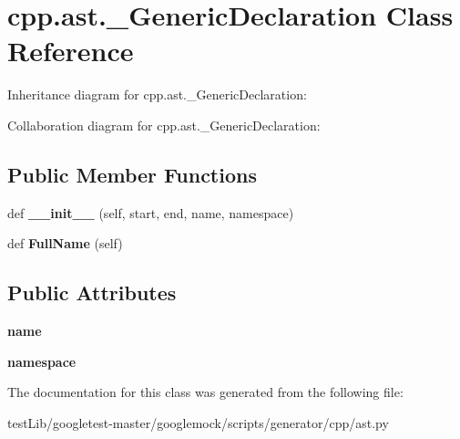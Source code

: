 \hypertarget{classcpp_1_1ast_1_1__GenericDeclaration}{}\section{cpp.\+ast.\+\_\+\+Generic\+Declaration Class Reference}
\label{classcpp_1_1ast_1_1__GenericDeclaration}


Inheritance diagram for cpp.\+ast.\+\_\+\+Generic\+Declaration\+:


Collaboration diagram for cpp.\+ast.\+\_\+\+Generic\+Declaration\+:
\subsection*{Public Member Functions}
\begin{DoxyCompactItemize}
\item 
\mbox{\label{classcpp_1_1ast_1_1__GenericDeclaration_afde72751e20708a7802eb7707d23bc3c}} 
def {\bfseries \+\_\+\+\_\+init\+\_\+\+\_\+} (self, start, end, name, namespace)
\item 
\mbox{\label{classcpp_1_1ast_1_1__GenericDeclaration_a1437d31271ea8cda62da22e2ce427a85}} 
def {\bfseries Full\+Name} (self)
\end{DoxyCompactItemize}
\subsection*{Public Attributes}
\begin{DoxyCompactItemize}
\item 
\mbox{\label{classcpp_1_1ast_1_1__GenericDeclaration_af774f4729dfd78d0538a6782fe8514c1}} 
{\bfseries name}
\item 
\mbox{\label{classcpp_1_1ast_1_1__GenericDeclaration_a8aee3f11b37449d54b42a78e0a689f46}} 
{\bfseries namespace}
\end{DoxyCompactItemize}


The documentation for this class was generated from the following file\+:\begin{DoxyCompactItemize}
\item 
test\+Lib/googletest-\/master/googlemock/scripts/generator/cpp/ast.\+py\end{DoxyCompactItemize}
